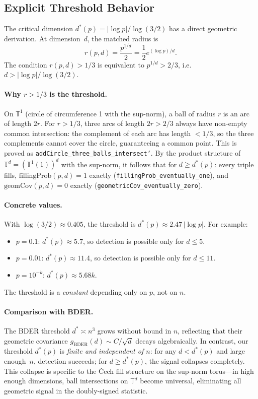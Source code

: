 \documentclass[reqno,12pt]{amsart}
\newcommand{\geomCov}{\mathrm{geomCov}}
\newcommand{\fillingP}{\mathrm{fillingProb}}
\newcommand{\TT}{\mathbb{T}}         %
\newcommand{\AddCircle}{\mathbb{T}^1}%
\newcommand{\lean}[1]{\textup{\texttt{\small #1}}}
\theoremstyle{plain}
\theoremstyle{definition}
\theoremstyle{remark}
\begin{document}
\subsection{Explicit Threshold Behavior}\label{sec:threshold}

The critical dimension $d^*(p) = |\log p|/\log(3/2)$ has a direct geometric derivation.
At dimension~$d$, the matched radius is
\[
  r(p,d) = \frac{p^{1/d}}{2} = \frac{1}{2}e^{(\log p)/d}.
\]
The condition $r(p,d) > 1/3$ is equivalent to $p^{1/d} > 2/3$, i.e.\
$d > |\log p|/\log(3/2)$.

\paragraph{Why $r > 1/3$ is the threshold.}
On $\AddCircle$ (circle of circumference 1 with the sup-norm), a ball of radius $r$ is
an arc of length $2r$. For $r > 1/3$, three arcs of length $2r > 2/3$ always have
non-empty common intersection: the complement of each arc has length $< 1/3$, so the three
complements cannot cover the circle, guaranteeing a common point.
This is proved as \lean{addCircle\_three\_balls\_intersect'}.
By the product structure of $\TT^d = (\AddCircle(1))^d$ with the sup-norm, it follows that
for $d \geq d^*(p)$: every triple fills, $\fillingP(p,d) = 1$ exactly
(\lean{fillingProb\_eventually\_one}), and $\geomCov(p,d) = 0$ exactly
(\lean{geometricCov\_eventually\_zero}).

\paragraph{Concrete values.}
With $\log(3/2) \approx 0.405$, the threshold is $d^*(p) \approx 2.47\,|\log p|$.
For example:
\begin{itemize}
  \item $p = 0.1$: $d^*(p) \approx 5.7$, so detection is possible only for $d \leq 5$.
  \item $p = 0.01$: $d^*(p) \approx 11.4$, so detection is possible only for $d \leq 11$.
  \item $p = 10^{-k}$: $d^*(p) \approx 5.68k$.
\end{itemize}
The threshold is a \emph{constant} depending only on $p$, not on $n$.

\paragraph{Comparison with BDER.}
The BDER threshold $d^* \asymp n^3$ grows without bound in $n$, reflecting that their
geometric covariance $g_\mathrm{BDER}(d) \sim C/\sqrt{d}$ decays algebraically.
In contrast, our threshold $d^*(p)$ is \emph{finite and independent of $n$}: for any
$d < d^*(p)$ and large enough~$n$, detection succeeds; for $d \geq d^*(p)$, the signal
collapses completely. This collapse is specific to the Čech fill structure on the
sup-norm torus---in high enough dimensions, ball intersections on $\TT^d$
become universal, eliminating all geometric signal in the doubly-signed statistic.
\end{document}
